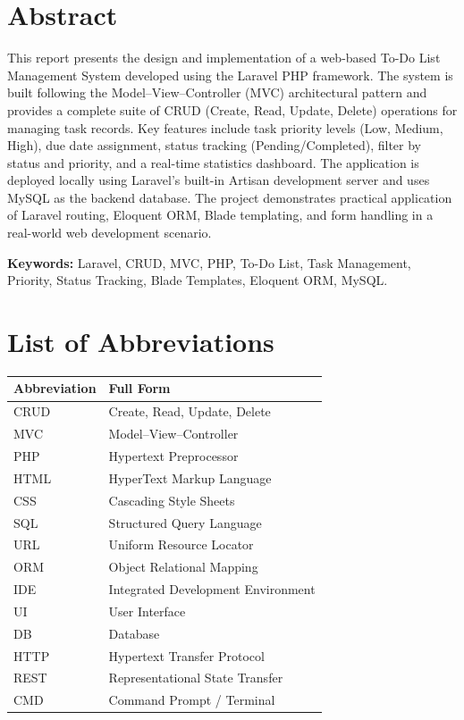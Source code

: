 \documentclass[12pt,a4paper]{report}
\begin{document}

\chapter*{Abstract}

This report presents the design and implementation of a web-based To-Do List
Management System developed using the Laravel PHP framework. The system is built
following the Model--View--Controller (MVC) architectural pattern and provides a
complete suite of CRUD (Create, Read, Update, Delete) operations for managing task
records. Key features include task priority levels (Low, Medium, High), due date
assignment, status tracking (Pending/Completed), filter by status and priority, and
a real-time statistics dashboard. The application is deployed locally using Laravel's
built-in Artisan development server and uses MySQL as the backend database. The
project demonstrates practical application of Laravel routing, Eloquent ORM, Blade
templating, and form handling in a real-world web development scenario.

\vspace{1cm}
\textbf{Keywords:} Laravel, CRUD, MVC, PHP, To-Do List, Task Management,
Priority, Status Tracking, Blade Templates, Eloquent ORM, MySQL.

\chapter*{List of Abbreviations}

\begin{tabularx}{\textwidth}{@{}lX@{}}
\toprule
\textbf{Abbreviation} & \textbf{Full Form} \\
\midrule
CRUD   & Create, Read, Update, Delete \\
MVC    & Model--View--Controller \\
PHP    & Hypertext Preprocessor \\
HTML   & HyperText Markup Language \\
CSS    & Cascading Style Sheets \\
SQL    & Structured Query Language \\
URL    & Uniform Resource Locator \\
ORM    & Object Relational Mapping \\
IDE    & Integrated Development Environment \\
UI     & User Interface \\
DB     & Database \\
HTTP   & Hypertext Transfer Protocol \\
REST   & Representational State Transfer \\
CMD    & Command Prompt / Terminal \\
\bottomrule
\end{tabularx}
\end{document}
